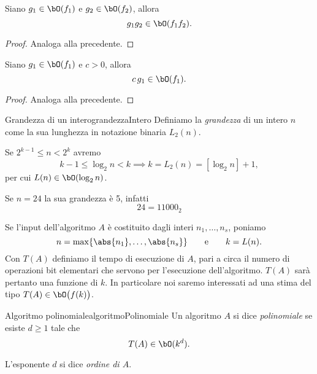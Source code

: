 	\begin{pr}
	Siano \(g_1\in \bO(f_1)\) e \(g_2\in \bO(f_2)\), allora
		\[
		g_1 g_2 \in \bO(f_1 f_2).
		\]
	\end{pr}

	\begin{proof}
	Analoga alla precedente.
	\end{proof}

	\begin{pr}
	Siano \(g_1\in \bO(f_1)\) e \(c>0\), allora
		\[
		c\,g_1 \in \bO(f_1).
		\]
	\end{pr}

	\begin{proof}
	Analoga alla precedente.
	\end{proof}

	\begin{defn}{Grandezza di un intero}{grandezzaIntero}
	Definiamo la \emph{grandezza} di un intero \(n\) come la sua lunghezza in notazione binaria \(L_2(n)\).
	\end{defn}

	\begin{oss}
	Se \(2^{k-1}\le n < 2^k\) avremo
		\[
		k-1 \le \log_2 n < k \implies k = L_2(n) = [\log_2 n] + 1,
		\]
	per cui \(L(n) \in \bO(\log_2 n)\).
	\end{oss}

	\begin{ese}
	Se \(n=24\) la sua grandezza è 5, infatti
		\[
		24 = 11000_2
		\]
	\end{ese}
%
%
	Se l'input dell'algoritmo \(A\) è costituito dagli interi \(n_1,\ldots,n_s\), poniamo
		\[
		n = \max\{\abs{n_1},\ldots,\abs{n_s}\} \qquad\text{e}\qquad k=L(n).
		\]
	Con \(T(A)\) definiamo il tempo di esecuzione di \(A\), pari a circa il numero di operazioni bit elementari che servono per l'esecuzione dell'algoritmo.
	\(T(A)\) sarà pertanto una funzione di \(k\). In particolare noi saremo interessati ad una stima del tipo \(T(A)\in \bO\big(f(k)\big)\).

	\begin{defn}{Algoritmo polinomiale}{algoritmoPolinomiale}
	Un algoritmo \(A\) si dice \emph{polinomiale} se esiste \(d\ge 1\) tale che
		\[
		T(A) \in \bO(k^d).
		\]
	\end{defn}

	\begin{notz}
	L'esponente \(d\) si dice \emph{ordine di \(A\)}.
	\end{notz}

